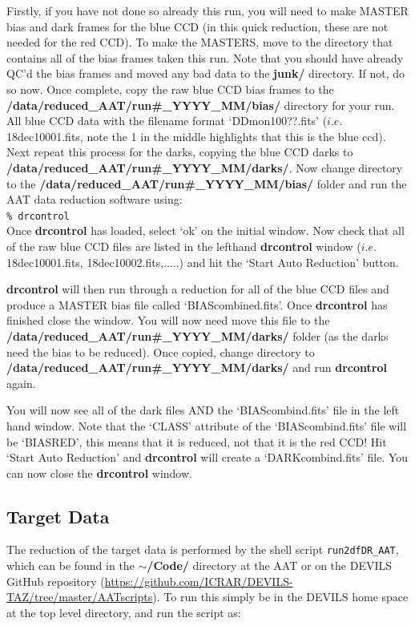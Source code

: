\documentclass[12pt]{article}
\begin{document}
Firstly, if you have not done so already this run,  you will need to make MASTER bias and dark frames for the blue CCD (in this quick reduction, these are not needed for the red CCD). To make the MASTERS, move to the directory that contains all of the bias frames taken this run. Note that you should have already QC'd the bias frames and moved any bad data to the \textbf{junk/} directory.  If not, do so now. Once complete, copy the raw blue CCD bias frames to the \textbf{/data/reduced\_AAT/run\#\_YYYY\_MM/bias/} directory for your run. All blue CCD data with the filename format `DDmon100??.fits' ($i.e.$ 18dec10001.fits, note the 1 in the middle highlights that this is the blue ccd). Next repeat this process for the darks, copying the blue CCD darks to \textbf{/data/reduced\_AAT/run\#\_YYYY\_MM/darks/}. Now change directory to the \textbf{/data/reduced\_AAT/run\#\_YYYY\_MM/bias/} folder and run the AAT data reduction software using: \\

\texttt{\% drcontrol} \\

Once \textbf{drcontrol} has loaded, select `ok' on the initial window. Now check that all of the raw blue CCD files are listed in the lefthand \textbf{drcontrol} window ($i.e.$ 18dec10001.fits, 18dec10002.fits,.....) and hit the `Start Auto Reduction' button. 

\textbf{drcontrol} will then run through a reduction for all of the blue CCD files and produce a MASTER bias file called `BIAScombined.fits'. Once \textbf{drcontrol} has finished close the window. You will now need move this file to the \textbf{/data/reduced\_AAT/run\#\_YYYY\_MM/darks/} folder (as the darks need the bias to be reduced). Once copied,  change directory to \textbf{/data/reduced\_AAT/run\#\_YYYY\_MM/darks/} and run \textbf{drcontrol} again.

You will now see all of the dark files AND the `BIAScombind.fits' file in the left hand window. Note that the `CLASS' attribute of the `BIAScombind.fits' file will be `BIASRED', this means that it is reduced, not that it is the red CCD! Hit `Start Auto Reduction' and \textbf{drcontrol} will create a `DARKcombind.fits' file.  You can now close the \textbf{drcontrol} window.
 

\subsection{Target Data}

The reduction of the target data is performed by the shell script \texttt{run2dfDR\_AAT}, which can be found in the \textbf{$\sim$/Code/} directory at the AAT or on the DEVILS GitHub repository (\url{https://github.com/ICRAR/DEVILS-TAZ/tree/master/AATscripts}). To run this simply be in the DEVILS home space at the top level directory, and run the script as:\\
\end{document}
